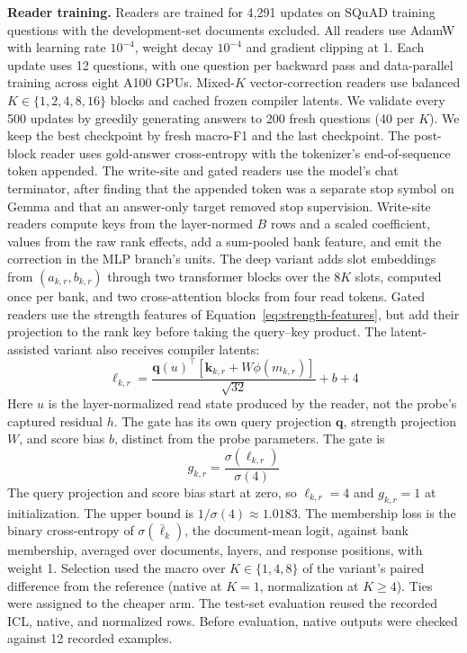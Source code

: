 \textbf{Reader training.} Readers are trained for 4,291 updates on SQuAD training
questions with the development-set documents excluded. All readers use AdamW with
learning rate $10^{-4}$, weight decay $10^{-4}$ and gradient clipping at 1.
Each update uses 12 questions, with one question per backward pass and data-parallel
training across eight A100 GPUs. Mixed-$K$ vector-correction readers use balanced
$K\in\{1,2,4,8,16\}$ blocks and cached frozen
compiler latents. We validate every 500 updates by greedily generating answers to
200 fresh questions (40 per $K$). We keep the best checkpoint by fresh macro-F1
and the last checkpoint. The post-block reader uses gold-answer cross-entropy with the
tokenizer's end-of-sequence token appended. The write-site and gated readers use the
model's chat terminator, after finding that the appended token was a separate stop
symbol on Gemma and that an answer-only target removed stop supervision. Write-site
readers compute keys from the layer-normed $B$ rows and a scaled coefficient, values
from the raw rank effects, add a sum-pooled bank feature, and emit the correction in
the MLP branch's units. The deep variant adds slot embeddings from $(a_{k,r},b_{k,r})$ through
two transformer blocks over the $8K$ slots, computed once per bank, and two
cross-attention blocks from four read tokens. Gated readers use the strength
features of Equation~\ref{eq:strength-features}, but add their projection to
the rank key before taking the query--key product. The latent-assisted variant
also receives compiler latents:
\begin{equation}
\ell_{k,r}=
\frac{\mathbf q(u)^{\top}
 [\mathbf k_{k,r}+W\phi(m_{k,r})]}{\sqrt{32}}
+b+4
\label{eq:trained-gate-score}
\end{equation}
Here $u$ is the layer-normalized read state produced by the reader, not the
probe's captured residual $h$. The gate has its own query projection $\mathbf q$,
strength projection $W$, and score bias $b$, distinct from the probe parameters.
The gate is
\begin{equation}
g_{k,r}=\frac{\sigma(\ell_{k,r})}{\sigma(4)}
\label{eq:trained-gate}
\end{equation}
The query projection and score bias start at zero, so $\ell_{k,r}=4$ and
$g_{k,r}=1$ at initialization. The upper bound is
$1/\sigma(4)\approx1.0183$. The membership loss is the binary cross-entropy of $\sigma(\bar\ell_k)$, the
document-mean logit, against bank membership, averaged over documents, layers, and
response positions, with weight 1. Selection used the macro over $K\in\{1,4,8\}$ of
the variant's paired difference from the reference (native at $K=1$,
normalization at $K\geq4$). Ties were assigned to the cheaper arm. The test-set evaluation
reused the recorded ICL, native, and normalized rows. Before evaluation,
native outputs were checked against 12 recorded examples.

